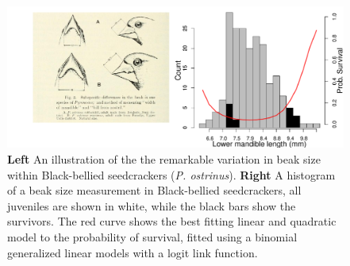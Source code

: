 \begin{figure}
\begin{center}
\includegraphics[width= \textwidth]{Journal_figs/Quant_gen/Smith_black_bellied_seed_cracker/Smith_black_bellied.pdf}
\end{center}
\caption{ {\bf Left} An illustration of the the remarkable variation
  in beak size within Black-bellied seedcrackers ({\it  P.
    ostrinus}). {\bf Right} A histogram of a beak size measurement in
  Black-bellied seedcrackers, all juveniles are shown in white, while the
  black bars show the survivors. The red curve shows the best fitting
  linear and quadratic model to the probability of survival, fitted
  using a binomial generalized linear models with a logit link function.  
     } \label{Black_bellied_seedcrackers_beaks}
\end{figure}


